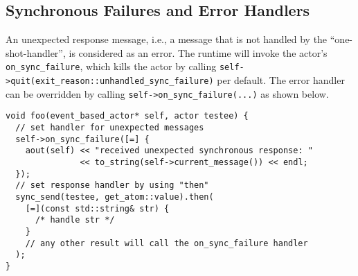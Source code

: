 \clearpage
\subsection{Synchronous Failures and Error Handlers}

An unexpected response message, i.e., a message that is not handled by the ``one-shot-handler'', is considered as an error. The runtime will invoke the actor's \lstinline^on_sync_failure^, which kills the actor by calling \lstinline^self->quit(exit_reason::unhandled_sync_failure)^ per default. The error handler can be overridden by calling \lstinline^self->on_sync_failure(...)^ as shown below.

\begin{lstlisting}
void foo(event_based_actor* self, actor testee) {
  // set handler for unexpected messages
  self->on_sync_failure([=] {
    aout(self) << "received unexpected synchronous response: "
               << to_string(self->current_message()) << endl;
  });
  // set response handler by using "then"
  sync_send(testee, get_atom::value).then(
    [=](const std::string& str) {
      /* handle str */
    }
    // any other result will call the on_sync_failure handler
  );
}
\end{lstlisting}

